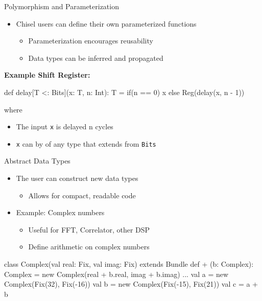 \documentclass[xcolor=pdflatex,dvipsnames,table]{beamer}
\begin{document}
\begin{frame}[fragile]{Polymorphism and Parameterization}
\begin{itemize}
\item Chisel users can define their own parameterized functions
\begin{itemize}
\item Parameterization encourages reusability
\item Data types can be inferred and propagated
\end{itemize}
\end{itemize}

\textbf{Example Shift Register:}
\begin{scala}
def delay[T <: Bits](x: T, n: Int): T = 
  if(n == 0) x else Reg(delay(x, n - 1))
\end{scala}
where
\begin{itemize}
\item The input \verb+x+ is delayed n cycles
\item \verb+x+ can by of any type that extends from \verb+Bits+
\end{itemize}

\end{frame}

\begin{frame}[fragile]{Abstract Data Types}
\begin{itemize}
\item The user can construct new data types
\begin{itemize}
\item Allows for compact, readable code
\end{itemize}
\item Example: Complex numbers
\begin{itemize}
\item Useful for FFT, Correlator, other DSP
\item Define arithmetic on complex numbers
\end{itemize}
\end{itemize}

\begin{footnotesize}
\begin{scala}
class Complex(val real: Fix, val imag: Fix) 
    extends Bundle {
  def + (b: Complex): Complex = 
    new Complex(real + b.real, imag + b.imag)
  ...
}
val a = new Complex(Fix(32), Fix(-16))
val b = new Complex(Fix(-15), Fix(21))
val c = a + b
\end{scala}
\end{footnotesize}

\end{frame}
\end{document}
